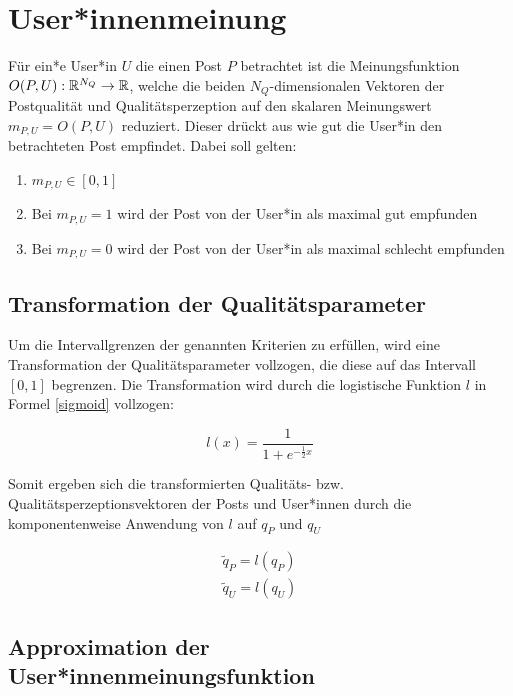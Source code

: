 \chapter{User*innenmeinung}
\label{chapter:bewertungsfunktionen}


Für ein*e User*in $U$ die einen Post $P$ betrachtet ist die Meinungsfunktion $O(P,U): \mathbb{R}^{N_Q} \rightarrow \mathbb{R}$, welche die beiden $N_Q$-dimensionalen Vektoren der Postqualität und Qualitätsperzeption auf den skalaren Meinungswert $m_{P,U} = O(P,U)$ reduziert. Dieser drückt aus wie gut die User*in den betrachteten Post empfindet. Dabei soll gelten:

\begin{enumerate}
	\item $m_{P,U} \in [0,1]$
	\item Bei $m_{P,U} = 1$ wird der Post von der User*in als maximal gut empfunden
	\item Bei $m_{P,U} = 0$ wird der Post von der User*in als maximal schlecht empfunden
\end{enumerate}

\section{Transformation der Qualitätsparameter}

Um die Intervallgrenzen der genannten Kriterien zu erfüllen, wird eine Transformation der Qualitätsparameter vollzogen, die diese auf das Intervall $[0,1]$ begrenzen. Die Transformation wird durch die logistische Funktion $l$ in Formel \ref{sigmoid} vollzogen:



\begin{equation}
\label{sigmoid}
l(x) = \frac{1}{1 + e^{-\frac{1}{2}x}}
\end{equation}

Somit ergeben sich die transformierten Qualitäts- bzw. Qualitätsperzeptionsvektoren der Posts und User*innen durch die komponentenweise Anwendung von $l$ auf $q_P$ und $q_U$

\begin{align}
\tilde{q}_P = l(q_P) \\
\tilde{q}_U = l(q_U) 
\end{align}

\section{Approximation der User*innenmeinungsfunktion}


